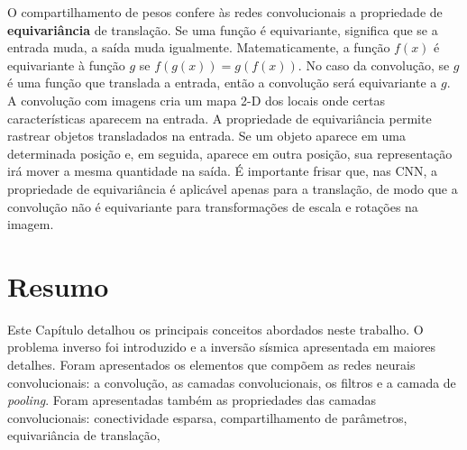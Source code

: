 O compartilhamento de pesos confere às redes convolucionais a propriedade de \textbf{equivariância} de
translação. Se uma função é equivariante, significa que se a entrada muda,
a saída muda igualmente. Matematicamente, a função $f(x)$ é equivariante à função $g$ se
$f(g(x)) = g(f(x))$. No caso da convolução, se $g$ é uma função que translada a entrada, então
a convolução será equivariante a $g$.
A convolução com imagens cria um mapa 2-D dos locais onde certas características aparecem na entrada.
A propriedade de equivariância permite rastrear objetos transladados na entrada. Se um objeto aparece
em uma determinada posição e, em seguida, aparece em outra posição, sua representação
irá mover a mesma quantidade na saída. É importante frisar que, nas CNN, a propriedade de equivariância
é aplicável apenas para a translação, de modo que a convolução não é equivariante para transformações 
de escala e rotações na imagem.

\section{Resumo}

Este Capítulo detalhou os principais conceitos abordados neste trabalho. O
problema inverso foi introduzido e a inversão sísmica apresentada em
maiores detalhes. Foram apresentados os elementos que compõem as redes
neurais convolucionais: a convolução, as camadas convolucionais, os filtros e a camada de \textit{pooling}.
Foram apresentadas também as propriedades das camadas convolucionais: conectividade esparsa,
compartilhamento de parâmetros, equivariância de translação, 